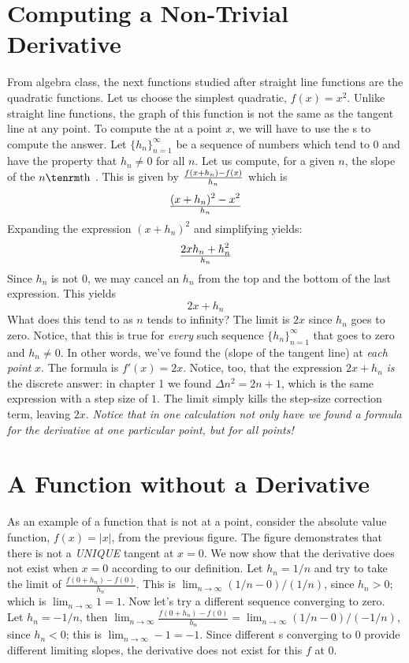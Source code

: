 \section{Computing a Non-Trivial Derivative}
From algebra class, the next functions studied after 
straight line functions are the quadratic functions. 
Let us choose the simplest 
quadratic, $f(x) = x^2$. Unlike straight line functions, the graph of this function is not 
the same as the tangent line at any point.
To compute the  at a point $x$, 
we will have to use 
the s to compute the answer. Let 
$\{h_n\}_{n=1}^{\infty}$ be a sequence of numbers which tend to $0$ and have the property that 
$h_n \ne 0$ for all $n$.
Let us compute, for a given $n$, the slope of the $n{\rm th}$ . 
This is given by $f(x+h_n) - f(x) \over h_n$ which is
$$
(x + h_n)^2 - x^2 \over h_n
$$
Expanding the expression $(x + h_n)^2$ and simplifying yields:
$$
2x h_n + h_n^2 \over h_n
$$
Since $h_n$ is not $0$, we may cancel an $h_n$ from the top and the bottom 
of the last expression.
This yields
$$
2x + h_n
$$
What does this tend to as $n$ tends to infinity?
The limit is $2x$ since $h_n$ goes to zero. Notice, that this is true for {\it every\/} such sequence 
$\{h_n\}_{n=1}^\infty$ that goes to zero and $h_n \ne 0$.
In other words, we've found the  (slope of the tangent line)
at {\it each point\/} $x$. The formula is $f'(x) = 2x$.
Notice, too, that the expression $2x + h_n$ {\it is\/} the discrete answer:
in chapter 1 we found $\Delta n^2 = 2n + 1$, which is the same expression
with a step size of $1$. The limit simply kills the step-size correction
term, leaving $2x$.
{\it Notice that in one calculation not only have we found a formula for the 
derivative at one particular point, but for all points!}

\section{A Function without a Derivative}
As an example of a function that is not  at a point,  consider the absolute value 
function, $f(x) = |x|$, from the previous figure. The figure demonstrates that there is not a {\it UNIQUE\/} tangent at $x=0$. We now 
show that the derivative does not exist when $x=0$ according to our definition.
Let $h_n = 1/n$ and try to take  the limit of $\frac{f(0 + h_n) - f(0)}{h_n}$.
This is $\lim_{n\rightarrow \infty} (1/n - 0)/(1/n)$, since $h_n > 0$;  which is $\lim_{n\rightarrow \infty} 1 = 1$.
Now let's try a different sequence converging to zero. Let $h_n = -1/n$, then
$\lim_{n\rightarrow \infty} \frac{f(0+ h_n) - f(0)}{h_n} = \lim_{n\rightarrow \infty} (1/n - 0)/(-1/n)$, since $h_n < 0$; this is
$\lim_{n\rightarrow\infty} -1 = -1$. Since different s converging to $0$ provide different
limiting slopes, the derivative does not exist for this $f$ at $0$.

